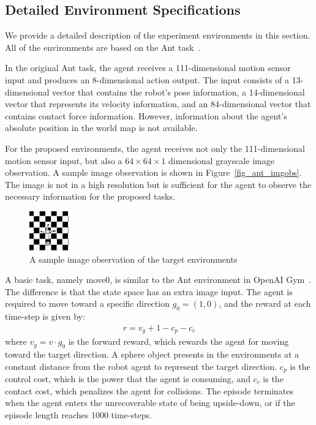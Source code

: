 
\subsection{Detailed Environment Specifications}
We provide a detailed description of the experiment environments in this section. All of the environments are based on the Ant task~\cite{openaigym}. 

In the original Ant task, the agent receives a 111-dimensional motion sensor input and produces an 8-dimensional action output. The input consists of a 13-dimensional vector that contains the robot's pose information, a 14-dimensional vector that represents its velocity information, and an 84-dimensional vector that contains contact force information. However, information about the agent's absolute position in the world map is not available.

For the proposed environments, the agent receives not only the 111-dimensional motion sensor input, but also a $64\times 64\times 1$ dimensional grayscale image observation. A sample image observation is shown in Figure~\ref{fig_ant_imgobs}. The image is not in a high resolution but is sufficient for the agent to observe the necessary information for the proposed tasks.

\begin{figure}[H]
	\includegraphics{images/ant_imgobs.png}
	\centering
	\caption{A sample image observation of the target environments}
\end{figure}\label{fig_ant_imgobs}

A basic task, namely move0, is similar to the Ant environment in OpenAI Gym~\cite{openaigym}. The difference is that the state space has an extra image input. The agent is required to move toward a specific direction $g_0=(1,0)$, and the reward at each time-step is given by:
\begin{align}
r = v_g + 1-c_p-c_c
\end{align}
where $v_g=v \cdot g_0$ is the forward reward, which rewards the agent for moving toward the target direction. A sphere object presents in the environments at a constant distance from the robot agent to represent the target direction.  $c_p$ is the control cost, which is the power that the agent is consuming, and $c_c$ is the contact cost, which penalizes the agent for collisions. The episode terminates when the agent enters the unrecoverable state of being upside-down, or if the episode length reaches 1000 time-steps.

